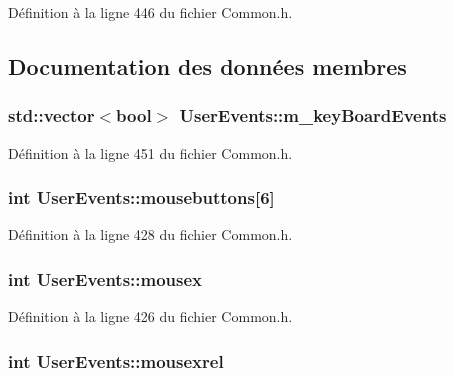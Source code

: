Définition à la ligne 446 du fichier Common.\-h.



\subsection{Documentation des données membres}
\hypertarget{struct_user_events_ae9e99946331657426862610d57e58c3e}{
\subsubsection[{m\-\_\-key\-Board\-Events}]{\setlength{\rightskip}{0pt plus 5cm}std\-::vector$<$bool$>$ User\-Events\-::m\-\_\-key\-Board\-Events}}\label{struct_user_events_ae9e99946331657426862610d57e58c3e}


Définition à la ligne 451 du fichier Common.\-h.

\hypertarget{struct_user_events_a0f1c058c9fdcdb7af88128178661f8ec}{
\subsubsection[{mousebuttons}]{\setlength{\rightskip}{0pt plus 5cm}int User\-Events\-::mousebuttons\mbox{[}6\mbox{]}}}\label{struct_user_events_a0f1c058c9fdcdb7af88128178661f8ec}


Définition à la ligne 428 du fichier Common.\-h.

\hypertarget{struct_user_events_a1d974059ccf68a4640fa703063fc7cd8}{
\subsubsection[{mousex}]{\setlength{\rightskip}{0pt plus 5cm}int User\-Events\-::mousex}}\label{struct_user_events_a1d974059ccf68a4640fa703063fc7cd8}


Définition à la ligne 426 du fichier Common.\-h.

\hypertarget{struct_user_events_a35b9f6ad1684725ab2d9dcdbbc715b73}{
\subsubsection[{mousexrel}]{\setlength{\rightskip}{0pt plus 5cm}int User\-Events\-::mousexrel}}\label{struct_user_events_a35b9f6ad1684725ab2d9dcdbbc715b73}


